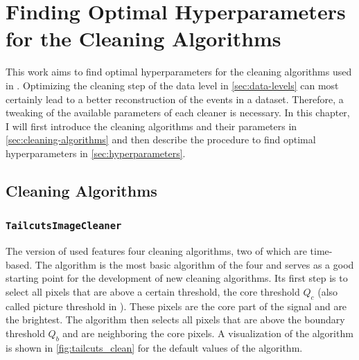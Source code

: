 \chapter{Finding Optimal Hyperparameters for the Cleaning Algorithms}%
\label{ch:finding-hyperparams}

This work aims to find optimal hyperparameters for the cleaning algorithms used in \ctapipe{}.
Optimizing the cleaning step of the \dlo{} data level in \autoref{sec:data-levels} can most certainly lead to a better
reconstruction of the events in a dataset. Therefore, a tweaking of the available parameters of each
cleaner is necessary. In this chapter, I will first introduce the cleaning algorithms and their parameters
in \autoref{sec:cleaning-algorithms} and then describe the procedure to find optimal hyperparameters
in \autoref{sec:hyperparameters}.
\vspace{-0.5cm}
\section{Cleaning Algorithms}%
\label{sec:cleaning-algorithms}
\vspace{-0.5cm}
\subsection*{\texttt{TailcutsImageCleaner}}%
\vspace{-0.2cm}
The version of \ctapipe{} used features four cleaning algorithms, two of which are time-based.
The \tailcuts{} algorithm is the most basic algorithm of the four and serves as a good
starting point for the development of new cleaning algorithms. Its first step is to select all
pixels that are above a certain threshold, the core threshold \(Q_c\) (also called picture threshold in \ctapipe{}). These
pixels are the core part of the signal and are the brightest. The \tailcuts{} algorithm
then selects all pixels that are above the boundary threshold \(Q_b\) and are neighboring
the core pixels. A visualization of the algorithm is shown in \autoref{fig:tailcuts_clean} for the
default values of the algorithm.

